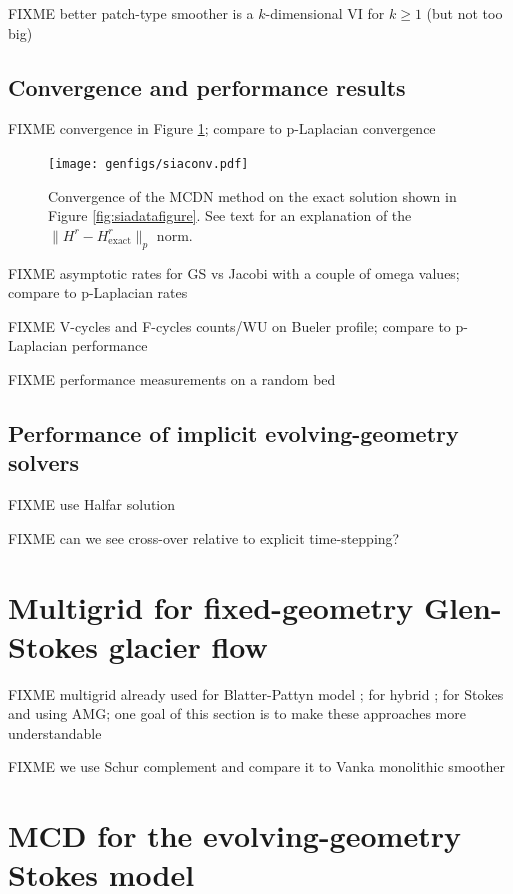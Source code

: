 \documentclass[letterpaper,final,12pt,reqno]{amsart}
\theoremstyle{claim}
\newcommand{\pp}{{\text{p}}}
\numberwithin{equation}{section}
\numberwithin{figure}{section}
\numberwithin{table}{section}
\numberwithin{theorem}{section}
\begin{document}
FIXME better patch-type smoother is a $k$-dimensional VI for $k\ge 1$ (but not too big)

\subsection{Convergence and performance results} \label{subsec:siaperformance}  FIXME convergence in Figure \ref{fig:siaconv}; compare to $\pp$-Laplacian convergence

\begin{figure}
\texttt{[image: genfigs/siaconv.pdf]}
\caption{Convergence of the MCDN method on the exact solution shown in Figure \ref{fig:siadatafigure}.  See text for an explanation of the $\|H^r-H_{\text{exact}}^r\|_p$ norm.}
\label{fig:siaconv}
\end{figure}

FIXME asymptotic rates for GS vs Jacobi with a couple of omega values; compare to $\pp$-Laplacian rates

FIXME V-cycles and F-cycles counts/WU on Bueler profile; compare to $\pp$-Laplacian performance

FIXME performance measurements on a random bed

\subsection{Performance of implicit evolving-geometry solvers} \label{subsec:siaimplicit}  FIXME use Halfar solution

FIXME can we see cross-over relative to explicit time-stepping?


\section{Multigrid for fixed-geometry Glen-Stokes glacier flow} \label{sec:stokes}

FIXME multigrid already used for Blatter-Pattyn model \cite{BrownSmithAhmadia2013}; for hybrid \cite{Jouvetetal2013,JouvetGraeser2013}; for Stokes \cite{IsaacStadlerGhattas2015} and \cite{Tuminaroetal2016} using AMG; one goal of this section is to make these approaches more understandable

FIXME we use Schur complement \cite{Bueler2021,Elmanetal2014} and compare it to Vanka monolithic smoother \cite{Farrelletal2019}


\section{MCD for the evolving-geometry Stokes model} \label{sec:evolvingstokes}
\end{document}

